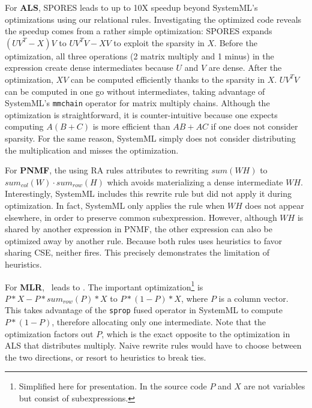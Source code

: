 For \textbf{ALS}, SPORES leads to up to 10X speedup beyond SystemML's
optimizations using our relational rules. Investigating the optimized code
reveals the speedup comes from a rather simple optimization: SPORES expands
$(UV^T - X)V$ to $UV^TV-XV$ to exploit the sparsity in $X$. Before the optimization,
all three operations (2 matrix multiply and 1 minus) 
in the expression create dense intermediates because $U$
and $V$ are dense. After the optimization, $XV$ can be computed efficiently thanks to
the sparsity in $X$. $UV^TV$ can be computed in one go without intermediates, taking advantage of
SystemML's \texttt{mmchain} operator for matrix multiply chains. Although the
optimization is straightforward, it is counter-intuitive because one expects
computing $A(B + C)$ is more efficient than $AB + AC$ if one does not consider
sparsity. For the same reason, SystemML simply does not consider distributing
the multiplication and misses the optimization.

For \textbf{PNMF}, the  using RA rules attributes to rewriting $sum(WH)$
to $sum_{col}(W) \cdot sum_{row}(H)$ which avoids materializing a dense
intermediate $WH$. Interestingly, SystemML includes this rewrite rule but did
not apply it during optimization. In fact, SystemML only applies the rule when
$WH$ does not appear elsewhere, in order to preserve common subexpression.
However, although $WH$ is shared by another expression in PNMF, the other
expression can also be optimized away by another rule. Because both rules uses heuristics to favor sharing CSE, neither fires. 
This precisely
demonstrates the limitation of heuristics. 

For \textbf{MLR}, \sys\ leads to . The important optimization\footnote{Simplified here for
  presentation. In the source code $P$ and $X$ are not variables but consist of
  subexpressions. } is $P * X - P * sum_{row}(P) * X$ to
$P*(1-P)*X$, where $P$ is a column vector. This takes advantage of the
\texttt{sprop} fused operator in SystemML to compute $P*(1-P)$, therefore
allocating only one intermediate. Note that the optimization factors out $P$, which
is the exact opposite to the optimization in ALS that distributes multiply. Naive
rewrite rules would have to choose between the two directions, or resort to
heuristics to break ties. 

